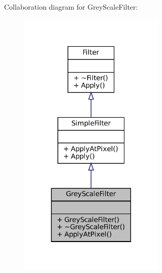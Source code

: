 Collaboration diagram for Grey\+Scale\+Filter\+:\nopagebreak
\begin{figure}[H]
\begin{center}
\leavevmode
\includegraphics[width=197pt]{classGreyScaleFilter__coll__graph}
\end{center}
\end{figure}
